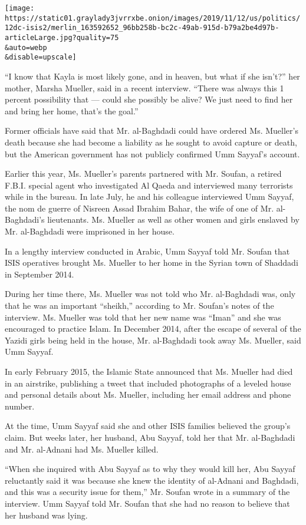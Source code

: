 \texttt{[image: https://static01.graylady3jvrrxbe.onion/images/2019/11/12/us/politics/12dc-isis2/merlin\_163592652\_96bb258b-bc2c-49ab-915d-b79a2be4d97b-articleLarge.jpg?quality=75\\\&auto=webp\\\&disable=upscale]}

``I know that Kayla is most likely gone, and in heaven, but what if she
isn't?'' her mother, Marsha Mueller, said in a recent interview. ``There
was always this 1 percent possibility that --- could she possibly be
alive? We just need to find her and bring her home, that's the goal.''

Former officials have said that Mr. al-Baghdadi could have ordered Ms.
Mueller's death because she had become a liability as he sought to avoid
capture or death, but the American government has not publicly confirmed
Umm Sayyaf's account.

Earlier this year, Ms. Mueller's parents partnered with Mr. Soufan, a
retired F.B.I. special agent who investigated Al Qaeda and interviewed
many terrorists while in the bureau. In late July, he and his colleague
interviewed Umm Sayyaf, the nom de guerre of Nisreen Assad Ibrahim
Bahar, the wife of one of Mr. al-Baghdadi's lieutenants. Ms. Mueller as
well as other women and girls enslaved by Mr. al-Baghdadi were
imprisoned in her house.

In a lengthy interview conducted in Arabic, Umm Sayyaf told Mr. Soufan
that ISIS operatives brought Ms. Mueller to her home in the Syrian town
of Shaddadi in September 2014.

During her time there, Ms. Mueller was not told who Mr. al-Baghdadi was,
only that he was an important ``sheikh,'' according to Mr. Soufan's
notes of the interview. Ms. Mueller was told that her new name was
``Iman'' and she was encouraged to practice Islam. In December 2014,
after the escape of several of the Yazidi girls being held in the house,
Mr. al-Baghdadi took away Ms. Mueller, said Umm Sayyaf.

In early February 2015, the Islamic State announced that Ms. Mueller had
died in an airstrike, publishing a tweet that included photographs of a
leveled house and personal details about Ms. Mueller, including her
email address and phone number.

At the time, Umm Sayyaf said she and other ISIS families believed the
group's claim. But weeks later, her husband, Abu Sayyaf, told her that
Mr. al-Baghdadi and Mr. al-Adnani had Ms. Mueller killed.

``When she inquired with Abu Sayyaf as to why they would kill her, Abu
Sayyaf reluctantly said it was because she knew the identity of
al-Adnani and Baghdadi, and this was a security issue for them,'' Mr.
Soufan wrote in a summary of the interview. Umm Sayyaf told Mr. Soufan
that she had no reason to believe that her husband was lying.


